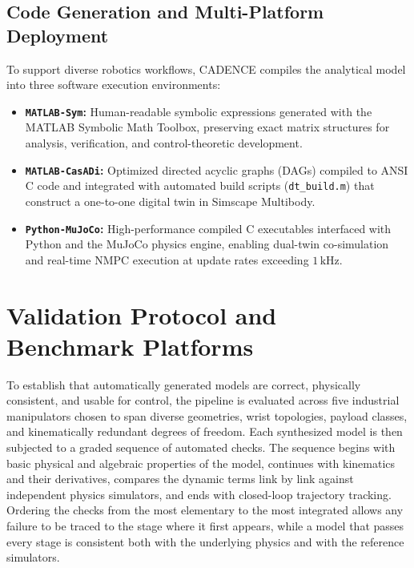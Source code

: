 \documentclass[fleqn,10pt]{article}
\begin{document}
\subsection{Code Generation and Multi-Platform Deployment}
\label{subsec:codegen_tiers}
To support diverse robotics workflows, CADENCE compiles the analytical model into three software execution environments:
\begin{itemize} 
	\item \textbf{\texttt{MATLAB-Sym}:} Human-readable symbolic expressions generated with the MATLAB Symbolic Math Toolbox, preserving exact matrix structures for analysis, verification, and control-theoretic development. 
	\item \textbf{\texttt{MATLAB-CasADi}:} Optimized directed acyclic graphs (DAGs) compiled to ANSI C code and integrated with automated build scripts (\texttt{dt\_build.m}) that construct a one-to-one digital twin in Simscape Multibody. 
	\item \textbf{\texttt{Python-MuJoCo}:} High-performance compiled C executables interfaced with Python and the MuJoCo physics engine, enabling dual-twin co-simulation and real-time NMPC execution at update rates exceeding $1\,\mathrm{kHz}$. 
\end{itemize}
\section{Validation Protocol and Benchmark Platforms}
\label{sec:validation}

To establish that automatically generated models are correct, physically consistent, and usable for control, the pipeline is evaluated across five industrial manipulators chosen to span diverse geometries, wrist topologies, payload classes, and kinematically redundant degrees of freedom. Each synthesized model is then subjected to a graded sequence of automated checks. The sequence begins with basic physical and algebraic properties of the model, continues with kinematics and their derivatives, compares the dynamic terms link by link against independent physics simulators, and ends with closed-loop trajectory tracking. Ordering the checks from the most elementary to the most integrated allows any failure to be traced to the stage where it first appears, while a model that passes every stage is consistent both with the underlying physics and with the reference simulators.
\end{document}
